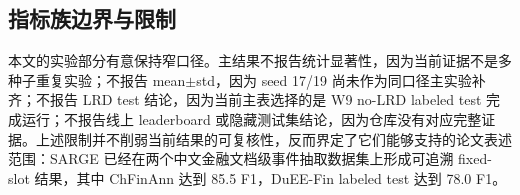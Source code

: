 \documentclass[UTF8,fontset=none,11pt]{ctexart}
\begin{document}
\subsection{指标族边界与限制}



本文的实验部分有意保持窄口径。主结果不报告统计显著性，因为当前证据不是多种子重复实验；不报告 mean$\pm$std，因为 seed 17/19 尚未作为同口径主实验补齐；不报告 LRD test 结论，因为当前主表选择的是 W9 no-LRD labeled test 完成运行；不报告线上 leaderboard 或隐藏测试集结论，因为仓库没有对应完整证据。上述限制并不削弱当前结果的可复核性，反而界定了它们能够支持的论文表述范围：SARGE 已经在两个中文金融文档级事件抽取数据集上形成可追溯 fixed-slot 结果，其中 ChFinAnn 达到 85.5 F1，DuEE-Fin labeled test 达到 78.0 F1。
\end{document}

